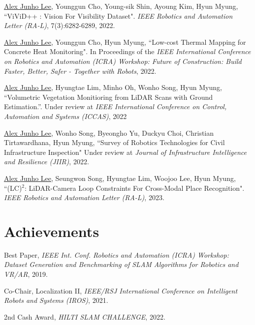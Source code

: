 \documentclass[margin]{res}
\begin{document}
\begin{resume}
		\par\underline{Alex Junho Lee}, Younggun Cho, Young-sik Shin, Ayoung Kim, Hyun Myung, ``ViViD++ : Vision For Visibility Dataset". \textit{IEEE Robotics and Automation Letter (RA-L)}, 7(3):6282-6289, 2022.
			
		\par\underline{Alex Junho Lee}, Younggun Cho, Hyun Myung, ``Low-cost Thermal Mapping for Concrete Heat Monitoring". In Proceedings of the \textit{IEEE International Conference on Robotics and Automation (ICRA) Workshop: Future of Construction: Build Faster, Better, Safer - Together with Robots}, 2022.
		
		\par\underline{Alex Junho Lee}, Hyungtae Lim, Minho Oh, Wonho Song, Hyun Myung, ``Volumetric Vegetation Monitioring from LiDAR Scans with Ground Estimation.''. Under review at \textit{IEEE International Conference on Control, Automation and Systems (ICCAS)}, 2022
		
		\par\underline{Alex Junho Lee}, Wonho Song, Byeongho Yu, Duckyu Choi, Christian Tirtawardhana, Hyun Myung, ``Survey of Robotics Technologies for Civil Infrastructure Inspection" Under review at \textit{Journal of Infrastructure Intelligence and Resilience (JIIR)}, 2022.
			
		\par\underline{Alex Junho Lee}, Seungwon Song, Hyungtae Lim, Woojoo Lee, Hyun Myung, ``(LC)$^2$: LiDAR-Camera Loop Constraints
		For Cross-Modal Place Recognition". \textit{IEEE Robotics and Automation Letter (RA-L)}, 2023.
		
		\newpage
		
		\section{Achievements}
		
		\par Best Paper,\textit{ IEEE Int. Conf. Robotics and Automation (ICRA) Workshop: Dataset Generation and Benchmarking of SLAM Algorithms for Robotics and VR/AR}, 2019.
						
		\par Co-Chair, Localization II, \textit{IEEE/RSJ International Conference on Intelligent Robots and Systems (IROS)}, 2021.
		
		\par 2nd Cash Award, \textit{HILTI SLAM CHALLENGE}, 2022.

\end{resume}
\end{document}
